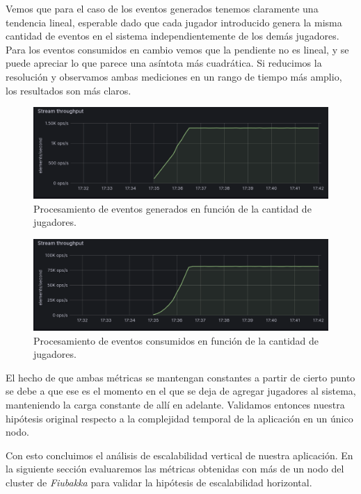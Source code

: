 Vemos que para el caso de los eventos generados tenemos claramente una tendencia lineal, esperable dado que cada jugador introducido genera la misma cantidad de eventos en el sistema independientemente de los demás jugadores.
Para los eventos consumidos en cambio vemos que la pendiente no es lineal, y se puede apreciar lo que parece una asíntota más cuadrática. Si reducimos la resolución y observamos ambas mediciones en un rango de tiempo más amplio,
los resultados son más claros.

\begin{figure}[htbp]
    \centering
    \includegraphics[width=1\textwidth]{../assets/stream-producer-amplified-metrics.png}
    \caption{Procesamiento de eventos generados en función de la cantidad de jugadores.}
\end{figure}

\begin{figure}[htbp]
    \centering
    \includegraphics[width=1\textwidth]{../assets/stream-consumer-amplified-metrics.png}
    \caption{Procesamiento de eventos consumidos en función de la cantidad de jugadores.}
\end{figure}

El hecho de que ambas métricas se mantengan constantes a partir de cierto punto se debe a que ese es el momento en el que se deja de agregar jugadores al sistema, manteniendo la carga
constante de allí en adelante. Validamos entonces nuestra hipótesis original respecto a la complejidad temporal de la aplicación en un único nodo.

Con esto concluimos el análisis de escalabilidad vertical de nuestra aplicación. En la siguiente sección evaluaremos las métricas obtenidas
con más de un nodo del cluster de \textit{Fiubakka} para validar la hipótesis de escalabilidad horizontal.

